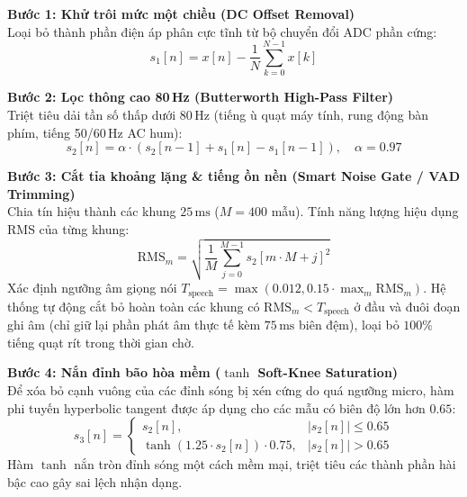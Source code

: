 \vspace{2mm}
\noindent\textbf{Bước 1: Khử trôi mức một chiều (DC Offset Removal)}\\
Loại bỏ thành phần điện áp phân cực tĩnh từ bộ chuyển đổi ADC phần cứng:
\begin{equation}
s_1[n] = x[n] - \frac{1}{N} \sum_{k=0}^{N-1} x[k]
\end{equation}

\vspace{1mm}
\noindent\textbf{Bước 2: Lọc thông cao 80\,Hz (Butterworth High-Pass Filter)}\\
Triệt tiêu dải tần số thấp dưới 80\,Hz (tiếng ù quạt máy tính, rung động bàn phím, tiếng 50/60\,Hz AC hum):
\begin{equation}
s_2[n] = \alpha \cdot \left( s_2[n-1] + s_1[n] - s_1[n-1] \right), \quad \alpha = 0.97
\end{equation}

\vspace{1mm}
\noindent\textbf{Bước 3: Cắt tỉa khoảng lặng \& tiếng ồn nền (Smart Noise Gate / VAD Trimming)}\\
Chia tín hiệu thành các khung $25\,\text{ms}$ ($M = 400$ mẫu). Tính năng lượng hiệu dụng RMS của từng khung:
\begin{equation}
\text{RMS}_m = \sqrt{\frac{1}{M} \sum_{j=0}^{M-1} s_2[m \cdot M + j]^2}
\end{equation}
Xác định ngưỡng âm giọng nói $T_{\text{speech}} = \max\left(0.012, 0.15 \cdot \max_m \text{RMS}_m\right)$. Hệ thống tự động cắt bỏ hoàn toàn các khung có $\text{RMS}_m < T_{\text{speech}}$ ở đầu và đuôi đoạn ghi âm (chỉ giữ lại phần phát âm thực tế kèm $75\,\text{ms}$ biên đệm), loại bỏ $100\%$ tiếng quạt rít trong thời gian chờ.

\vspace{1mm}
\noindent\textbf{Bước 4: Nắn đỉnh bão hòa mềm ($\tanh$ Soft-Knee Saturation)}\\
Để xóa bỏ cạnh vuông của các đỉnh sóng bị xén cứng do quá ngưỡng micro, hàm phi tuyến hyperbolic tangent được áp dụng cho các mẫu có biên độ lớn hơn $0.65$:
\begin{equation}
s_3[n] = \begin{cases}
s_2[n], & |s_2[n]| \le 0.65 \\
\tanh\left(1.25 \cdot s_2[n]\right) \cdot 0.75, & |s_2[n]| > 0.65
\end{cases}
\end{equation}
Hàm $\tanh$ nắn tròn đỉnh sóng một cách mềm mại, triệt tiêu các thành phần hài bậc cao gây sai lệch nhận dạng.

